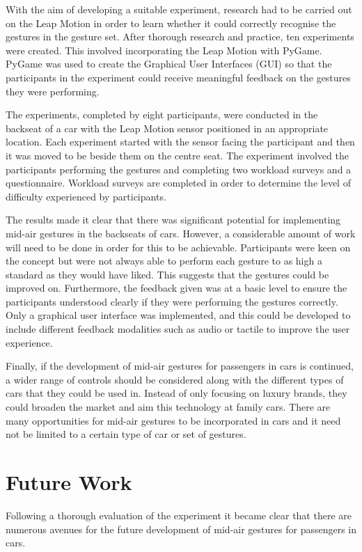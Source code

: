 \documentclass{l4proj}
\begin{document}
With the aim of developing a suitable experiment, research had to be carried out on the Leap Motion in order to learn whether it could correctly recognise the gestures in the gesture set. After thorough research and practice, ten experiments were created. This involved incorporating the Leap Motion with PyGame. PyGame was used to create the Graphical User Interfaces (GUI) so that the participants in the experiment could receive meaningful feedback on the gestures they were performing. 

The experiments, completed by eight participants, were conducted in the backseat of a car with the Leap Motion sensor positioned in an appropriate location.  Each experiment started with the sensor facing the participant and then it was moved to be beside them on the centre seat. The experiment involved the participants performing the gestures and completing two workload surveys and a questionnaire. Workload surveys are completed in order to determine the level of difficulty experienced by participants.

The results made it clear that there was significant potential for implementing mid-air gestures in the backseats of cars. However, a considerable amount of work will need to be done in order for this to be achievable. Participants were keen on the concept but were not always able to perform each gesture to as high a standard as they would have liked. This suggests that the gestures could be improved on. Furthermore, the feedback given was at a basic level to ensure the participants understood clearly if they were performing the gestures correctly. Only a graphical user interface was implemented, and this could be developed to include different feedback modalities such as audio or tactile to improve the user experience. 

Finally, if the development of mid-air gestures for passengers in cars is continued, a wider range of controls should be considered along with the different types of cars that they could be used in. Instead of only focusing on luxury brands, they could broaden the market and aim this technology at family cars. There are many opportunities for mid-air gestures to be incorporated in cars and it need not be limited to a certain type of car or set of gestures.

\section{Future Work}
Following a thorough evaluation of the experiment it became clear that there are numerous avenues for the future development of mid-air gestures for passengers in cars. 
\end{document}
